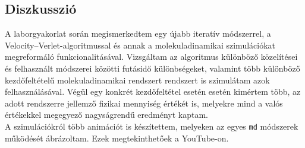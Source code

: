 \begin{multicols}{2}
\section{Diszkusszió} \label{sec:7}
A laborgyakorlat során megismerkedtem egy újabb iteratív módszerrel, a Velocity--Verlet-algoritmussal és annak a molekuladinamikai szimulációkat megreformáló funkcionalitásával. Vizsgáltam az algoritmus különböző közelítései és felhasznált módszerei közötti futásidő különbségeket, valamint több különböző kezdőfeltételű molekuladinamikai rendszert rendszert is szimulátam azok felhasználásával. Végül egy konkrét kezdőfeltétel esetén esetén kimértem több, az adott rendszerre jellemző fizikai mennyiség értékét is, melyekre mind a valós értékekkel megegyező nagyságrendű eredményt kaptam. \\
A szimulációkról több animációt is készítettem, melyeken az egyes \texttt{md} módszerek működését ábrázoltam. Ezek megtekinthetőek a YouTube-on\cite{yt}.

\end{multicols}